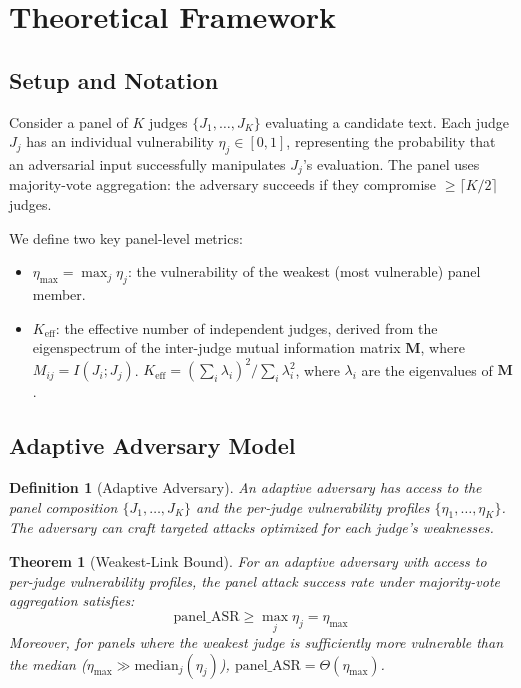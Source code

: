 \documentclass[11pt]{article}
\newtheorem{theorem}{Theorem}
\newtheorem{definition}{Definition}
\begin{document}
\section{Theoretical Framework}

\subsection{Setup and Notation}

Consider a panel of $K$ judges $\{J_1, \ldots, J_K\}$ evaluating a candidate text. Each judge $J_j$ has an individual vulnerability $\eta_j \in [0,1]$, representing the probability that an adversarial input successfully manipulates $J_j$'s evaluation. The panel uses majority-vote aggregation: the adversary succeeds if they compromise $\geq \lceil K/2 \rceil$ judges.

We define two key panel-level metrics:
\begin{itemize}
    \item $\eta_{\max} = \max_{j} \eta_j$: the vulnerability of the weakest (most vulnerable) panel member.
    \item $K_{\text{eff}}$: the effective number of independent judges, derived from the eigenspectrum of the inter-judge mutual information matrix $\mathbf{M}$, where $M_{ij} = I(J_i; J_j)$. $K_{\text{eff}} = \left(\sum_i \lambda_i\right)^2 / \sum_i \lambda_i^2$, where $\lambda_i$ are the eigenvalues of $\mathbf{M}$.
\end{itemize}

\subsection{Adaptive Adversary Model}

\begin{definition}[Adaptive Adversary]
An adaptive adversary has access to the panel composition $\{J_1, \ldots, J_K\}$ and the per-judge vulnerability profiles $\{\eta_1, \ldots, \eta_K\}$. The adversary can craft targeted attacks optimized for each judge's weaknesses.
\end{definition}

\begin{theorem}[Weakest-Link Bound]
\label{thm:weakest-link}
For an adaptive adversary with access to per-judge vulnerability profiles, the panel attack success rate under majority-vote aggregation satisfies:
\[
\text{panel\_ASR} \geq \max_j \eta_j = \eta_{\max}
\]
Moreover, for panels where the weakest judge is sufficiently more vulnerable than the median ($\eta_{\max} \gg \text{median}_j(\eta_j)$), $\text{panel\_ASR} = \Theta(\eta_{\max})$.
\end{theorem}
\end{document}
